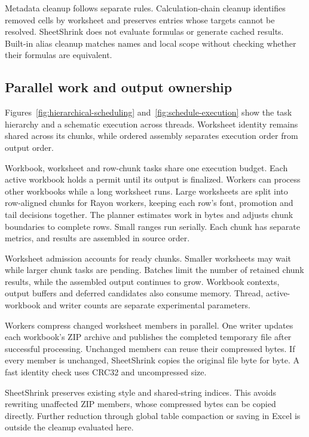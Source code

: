 Metadata cleanup follows separate rules. Calculation-chain cleanup identifies
removed cells by worksheet and preserves entries whose targets cannot be resolved.
SheetShrink does not evaluate formulas or generate cached results. Built-in alias
cleanup matches names and local scope without checking whether their formulas are
equivalent.

\subsection{Parallel work and output ownership}
Figures~\ref{fig:hierarchical-scheduling} and~\ref{fig:schedule-execution}
show the task hierarchy and a schematic execution across threads. Worksheet identity remains shared across
its chunks, while ordered assembly separates execution order from output order.


Workbook, worksheet and row-chunk tasks share one execution budget. Each active
workbook holds a permit until its output is finalized. Workers can process other
workbooks while a long worksheet runs. Large worksheets are split into row-aligned
chunks for Rayon workers, keeping each row's font, promotion and tail decisions
together. The planner estimates work in bytes and adjusts chunk boundaries to
complete rows. Small ranges run serially. Each chunk has separate metrics, and
results are assembled in source order.

Worksheet admission accounts for ready chunks. Smaller worksheets may wait while
larger chunk tasks are pending. Batches limit the number of retained chunk results,
while the assembled output continues to grow. Workbook contexts, output buffers
and deferred candidates also consume memory. Thread, active-workbook and writer
counts are separate experimental parameters.

Workers compress changed worksheet members in parallel. One writer updates each
workbook's ZIP archive and publishes the completed temporary file after successful
processing. Unchanged members can reuse their compressed bytes. If every member
is unchanged, SheetShrink copies the original file byte for byte. A fast identity
check uses CRC32 and uncompressed size.

SheetShrink preserves existing style and shared-string indices. This avoids
rewriting unaffected ZIP members, whose compressed bytes can be copied directly.
Further reduction through global table compaction or saving in Excel is outside
the cleanup evaluated here.

